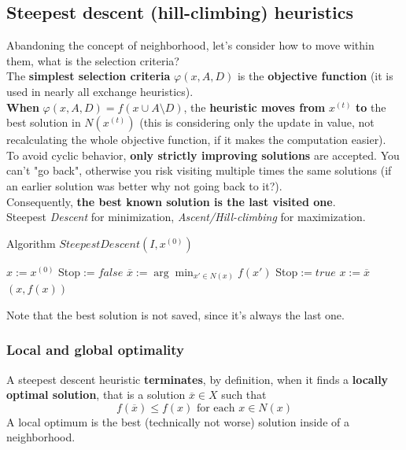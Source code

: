 \newpage

\subsection{Steepest descent (hill-climbing) heuristics}
Abandoning the concept of neighborhood, let's consider how to move within them, what is the selection criteria?\\

The \textbf{simplest selection criteria} $\varphi (x, A, D)$ is the \textbf{objective function} (it is used in nearly all exchange heuristics).\\

\textbf{When} $\varphi (x, A, D) = f (x \cup A \setminus D)$, the \textbf{heuristic moves from} $x^{(t)}$ \textbf{to} the best solution in $N (x^{(t)})$ (this is considering only the update in value, not recalculating the whole objective function, if it makes the computation easier).\\

To avoid cyclic behavior, \textbf{only strictly improving solutions} are accepted. You can't "go back", otherwise you risk visiting multiple times the same solutions (if an earlier solution was better why not going back to it?).\\
Consequently, \textbf{the best known solution is the last visited one}.\\

Steepest \textit{Descent} for minimization, \textit{Ascent/Hill-climbing} for maximization.
\begin{algorithm}
	\caption{Algorithm $SteepestDescent(I , x^{(0)})$}
	\begin{algorithmic}
		\STATE $x := x^{(0)}$
		\STATE Stop$ := false$
		\STATE $\overline{x} := \arg \min_{x' \in N(x)} f(x')$
		\STATE Stop$ := true$
		\ELSE 
		\STATE $x := \overline{x}$
		\ENDIF
		\ENDWHILE
		\RETURN $(x, f (x))$
	\end{algorithmic}
\end{algorithm}
Note that the best solution is not saved, since it's always the last one.\\

\newpage

\subsubsection{Local and global optimality}
A steepest descent heuristic \textbf{terminates}, by definition, when it finds a \textbf{locally optimal solution}, that is a solution $\overline{x} \in X$ such that
$$ f (\overline{x}) \leq f (x) \text{ for each } x \in N (x) $$
A local optimum is the best (technically not worse) solution inside of a neighborhood. 

